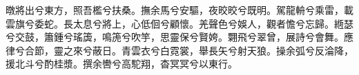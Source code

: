 
\begin{pinyinscope}
暾將出兮東方，照吾檻兮扶桑。撫余馬兮安驅，夜晈晈兮既明。駕龍輈兮乘雷，載雲旗兮委蛇。長太息兮將上，心低佪兮顧懷。羌聲色兮娛人，觀者憺兮忘歸。緪瑟兮交鼓，簫鍾兮瑤簴，鳴箎兮吹竽，思靈保兮賢姱。翾飛兮翠曾，展詩兮會舞。應律兮合節，靈之來兮蔽日。青雲衣兮白霓裳，舉長矢兮射天狼。操余弧兮反淪降，援北斗兮酌桂漿。撰余轡兮高駝翔，杳冥冥兮以東行。


\end{pinyinscope}